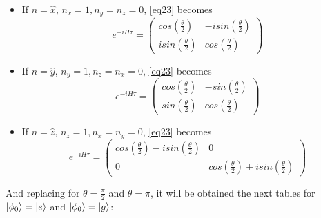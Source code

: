 \documentclass{article}
\begin{document}
\begin{itemize}
    \item If $\hat{n}=\hat{x}$, $n_x=1,n_y=n_z=0$, \ref{eq23} becomes 
    \begin{equation}\label{eq24}e^{-iH\tau}=\begin{pmatrix} cos(\frac{\theta}{2})& -isin(\frac{\theta}{2}) \\ isin(\frac{\theta}{2}) & cos(\frac{\theta}{2})\end{pmatrix}\end{equation}
    \item If $\hat{n}=\hat{y}$, $n_y=1,n_z=n_x=0$, \ref{eq23} becomes
    \begin{equation}\label{eq25}e^{-iH\tau}=\begin{pmatrix} cos(\frac{\theta}{2})& -sin(\frac{\theta}{2}) \\ sin(\frac{\theta}{2}) & cos(\frac{\theta}{2})\end{pmatrix}\end{equation}
    \item If $\hat{n}=\hat{z}$, $n_z=1,n_x=n_y=0$, \ref{eq23} becomes 
    \begin{equation}\label{eq26}e^{-iH\tau}=\begin{pmatrix} cos(\frac{\theta}{2})-i sin(\frac{\theta}{2})& 0 \\ 0 & cos(\frac{\theta}{2})+i sin(\frac{\theta}{2}) \end{pmatrix}\end{equation}
\end{itemize}
And replacing for $\theta=\frac{\pi}{2}$ and $\theta=\pi$, it will be obtained the next tables for $\ket{\phi_0}=\ket{e}$ and $\ket{\phi_0}=\ket{g}$:
\begin{center}
\begin{table}[h]
\end{table}
\end{center}
\end{document}
